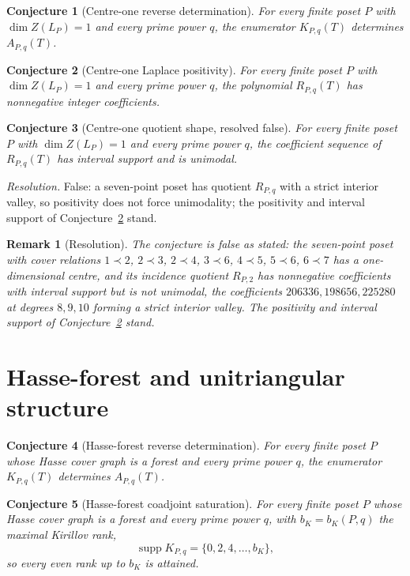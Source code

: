 \documentclass[11pt]{article}
\newtheorem{conjecture}{Conjecture}
\newtheorem{remark}{Remark}
\theoremstyle{definition}
\begin{document}
\begin{conjecture}[Centre-one reverse determination]\label{v12}
For every finite poset $P$ with $\dim Z(L_P)=1$ and every prime power $q$, the enumerator $K_{P,q}(T)$ determines $A_{P,q}(T)$.
\end{conjecture}

\begin{conjecture}[Centre-one Laplace positivity]\label{v13}
For every finite poset $P$ with $\dim Z(L_P)=1$ and every prime power $q$, the polynomial $R_{P,q}(T)$ has nonnegative integer coefficients.
\end{conjecture}

\begin{conjecture}[Centre-one quotient shape, resolved false]\label{v14}
For every finite poset $P$ with $\dim Z(L_P)=1$ and every prime power $q$, the coefficient sequence of $R_{P,q}(T)$ has interval support and is unimodal.
\end{conjecture}

\emph{Resolution.} False: a seven-point poset has quotient $R_{P,q}$ with a strict interior valley, so positivity does not force unimodality; the positivity and interval support of Conjecture~\ref{v13} stand.

\begin{remark}[Resolution]
The conjecture is false as stated: the seven-point poset with cover relations $1\prec2$, $2\prec3$, $2\prec4$, $3\prec6$, $4\prec5$, $5\prec6$, $6\prec7$ has a one-dimensional centre, and its incidence quotient $R_{P,2}$ has nonnegative coefficients with interval support but is not unimodal, the coefficients $206336,198656,225280$ at degrees $8,9,10$ forming a strict interior valley.  The positivity and interval support of Conjecture~\ref{v13} stand.
\end{remark}

\section{Hasse-forest and unitriangular structure}

\begin{conjecture}[Hasse-forest reverse determination]\label{v15}
For every finite poset $P$ whose Hasse cover graph is a forest and every prime power $q$, the enumerator $K_{P,q}(T)$ determines $A_{P,q}(T)$.
\end{conjecture}

\begin{conjecture}[Hasse-forest coadjoint saturation]\label{v16}
For every finite poset $P$ whose Hasse cover graph is a forest and every prime power $q$, with $b_K=b_K(P,q)$ the maximal Kirillov rank,
\[
\operatorname{supp}K_{P,q}=\{0,2,4,\ldots,b_K\},
\]
so every even rank up to $b_K$ is attained.
\end{conjecture}
\end{document}

